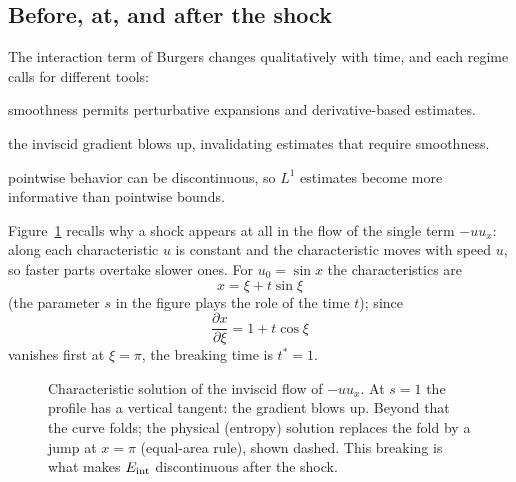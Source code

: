 \subsection{Before, at, and after the shock}
The interaction term of Burgers changes qualitatively with time, and each regime calls for different tools:
\begin{description}[nosep,leftmargin=3.2cm,labelwidth=3.0cm]
\item[Before shock formation] smoothness permits perturbative expansions and derivative-based estimates.
\item[At breaking] the inviscid gradient blows up, invalidating estimates that require smoothness.
\item[After shock formation] pointwise behavior can be discontinuous, so $L^1$ estimates become more informative than pointwise bounds.
\end{description}
Figure~\ref{fig:burgers} recalls why a shock appears at all in the flow of the single term $-uu_x$: along each characteristic $u$ is constant and the characteristic moves with speed $u$, so faster parts overtake slower ones. For $u_0=\sin x$ the characteristics are
\[
x=\xi+t\sin\xi
\]
(the parameter $s$ in the figure plays the role of the time $t$); since
\[
\frac{\partial x}{\partial\xi}=1+t\cos\xi
\]
vanishes first at $\xi=\pi$, the breaking time is $t^*=1$.
\begin{figure}[!htb]
\centering
{}
\caption{Characteristic solution of the inviscid flow of $-uu_x$. At $s=1$ the profile has a vertical tangent: the gradient blows up. Beyond that the curve folds; the physical (entropy) solution replaces the fold by a jump at $x=\pi$ (equal-area rule), shown dashed. This breaking is what makes $E_{\mathrm{int}}$ discontinuous after the shock.}\label{fig:burgers}
\end{figure}
